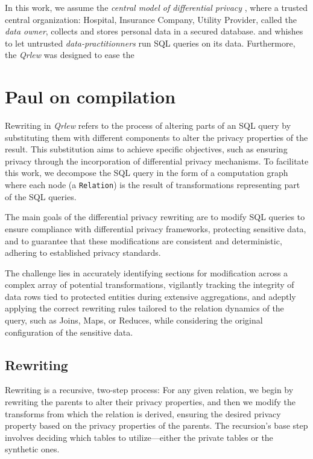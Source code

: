 \documentclass[letterpaper]{article} %
\newcommand{\qrlew}{\emph{Qrlew}}
\begin{document}
In this work, we assume the \emph{central model of differential privacy} \cite{near2020threat}, where a trusted central organization: Hospital, Insurance Company, Utility Provider, called the \emph{data owner}, collects and stores personal data in a secured database. and whishes to let untrusted \emph{data-practitionners} run SQL queries on its data.
Furthermore, the 
\qrlew{} was designed to ease the 

\section{Paul on compilation}

Rewriting in \qrlew{} refers to the process of altering parts of an SQL query by substituting them with different components to alter the privacy properties of the result. This substitution aims to achieve specific objectives, such as ensuring privacy through the incorporation of differential privacy mechanisms. To facilitate this work, we decompose the SQL query in the form of a computation graph where each node (a \texttt{Relation}) is the result of transformations representing part of the SQL queries.

The main goals of the differential privacy rewriting are to modify SQL queries to ensure compliance with differential privacy frameworks, protecting sensitive data, and to guarantee that these modifications are consistent and deterministic, adhering to established privacy standards.

The challenge lies in accurately identifying sections for modification across a complex array of potential transformations, vigilantly tracking the integrity of data rows tied to protected entities during extensive aggregations, and adeptly applying the correct rewriting rules tailored to the relation dynamics of the query, such as Joins, Maps, or Reduces, while considering the original configuration of the sensitive data.

\subsection{Rewriting}

Rewriting is a recursive, two-step process: For any given relation, we begin by rewriting the parents to alter their privacy properties, and then we modify the transforms from which the relation is derived, ensuring the desired privacy property based on the privacy properties of the parents. The recursion's base step involves deciding which tables to utilize—either the private tables or the synthetic ones.
\end{document}
